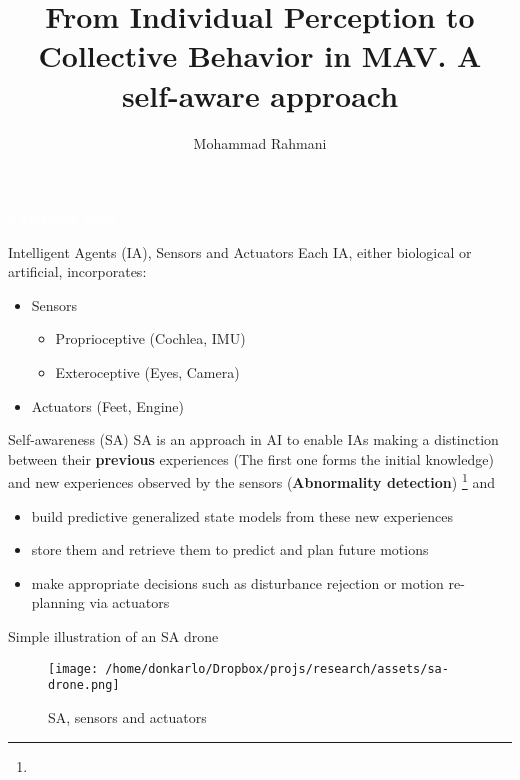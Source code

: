 \documentclass[unknownkeysallowed]{beamer}
\title{From Individual Perception to Collective Behavior in MAV. A self-aware approach}
\author{Mohammad Rahmani}
\institute{Pervasive Computing Group}
\begin{document}
	\begin{frame}
		\date{}
		\maketitle
		\textcolor{white}{\textbf{6 October 2020}}
	\end{frame}
	
	\begin{frame}{Intelligent Agents (IA), Sensors and Actuators}
		Each IA, either biological or artificial, incorporates:
		\begin{itemize}
			\item Sensors
				\begin{itemize}
					\item Proprioceptive (Cochlea, IMU)
					\item Exteroceptive (Eyes, Camera)
				\end{itemize}
			\item Actuators (Feet, Engine)
		\end{itemize}
	\end{frame}

	\begin{frame}{Self-awareness (SA)}
		SA is an approach in AI to enable IAs making a distinction between their \textbf{previous} experiences (The first one forms the initial knowledge) and new experiences observed by the sensors (\textbf{Abnormality detection}) \footnote{} and
		\begin{itemize}
			\item build predictive generalized state models from these new experiences 
			\item store them and retrieve them to predict and plan future motions
			\item make appropriate decisions such as disturbance rejection or motion re-planning via actuators
		\end{itemize}
	\end{frame}

	\begin{frame}{Simple illustration of an SA drone}
		\begin{figure}
			\texttt{[image: /home/donkarlo/Dropbox/projs/research/assets/sa-drone.png]}
			\caption{SA, sensors and actuators}
		\end{figure}
	\end{frame}
\end{document}
